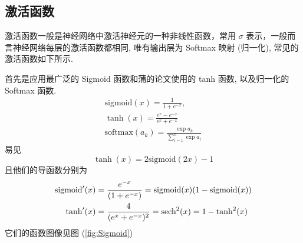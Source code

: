\subsection{激活函数}
激活函数一般是神经网络中激活神经元的一种非线性函数，常用 $\sigma$ 表示，一般而言神经网络每层的激活函数都相同, 唯有输出层为 Softmax 映射 (归一化), 常见的激活函数如下所示. 

首先是应用最广泛的 Sigmoid 函数和蒲的论文使用的 tanh 函数, 以及归一化的 Softmax 函数. 
\begin{equation}
    \begin{aligned}
        \text{sigmoid}(x) = \frac{1}{1+e^{-x}}, \\ 
        \tanh{(x)} = \frac{e^{x} - e^{-x}}{e^{x} + e^{-x}} \\
        \text{softmax}(a_k) = \frac{\exp a_k}{\sum_{i=1}^{n} \exp a_i}
    \end{aligned}
\end{equation} 
易见 
\begin{equation}
    \tanh(x) = 2 \text{sigmoid}(2x) - 1
\end{equation}
且他们的导函数分别为
\begin{align}\label{loss-example}
    \text{sigmoid}'(x) &= \frac{e^{-x}}{(1+e^{-x})} = \text{sigmoid}(x)(1-\text{sigmoid}(x)) \\
    \tanh '(x) &= \frac{4}{(e^x + e^{-x})^2} = \text{sech}^{2}(x) = 1 - \tanh ^{2}(x)
\end{align}
它们的函数图像见图 (\ref{fig:Sigmoid})
